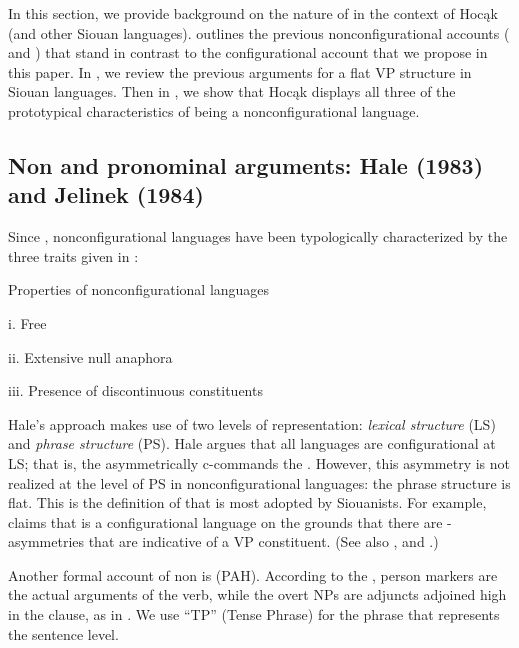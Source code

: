 \documentclass[output=paper]{LSP/langsci}
\begin{document}
 
In this section, we provide background on the nature of  in the context of Hocąk (and other Siouan languages).  outlines the previous nonconfigurational accounts (\citealt{Hale1983} and \citealt{Jelinek1984}) that stand in contrast to the configurational account that we propose in this paper. In , we review the previous arguments for a flat VP structure in Siouan languages. Then in , we show that Hocąk displays all three of the prototypical characteristics of being a nonconfigurational language.
 

\subsection{Non and pronominal arguments:  Hale (1983) and Jelinek (1984)}\label{sec:jrs:2.1}

Since \citet{Hale1983}, nonconfigurational languages have been typologically characterized by the three traits given in :

\begin{exe}
\ex\label{ex:jrs:3} Properties of nonconfigurational languages

	i.	Free 

	ii.	Extensive null anaphora

	iii.	Presence of discontinuous constituents
\end{exe}

Hale's approach makes use of two levels of representation: \textit{lexical structure} (LS) and \textit{phrase structure} (PS). Hale argues that all languages are configurational at LS; that is, the  asymmetrically c-commands the . However, this asymmetry is not realized at the level of PS in nonconfigurational languages: the phrase structure is flat. This is the definition of  that is most adopted by Siouanists. For example, \citet{Boyle2007} claims that  is a configurational language on the grounds that there are - asymmetries that are indicative of a VP constituent. (See also  \citealt{VanValin1985,VanValin1987,Williamson1984}, and \citealt{West2003}.) 

	Another formal account of non is  \textit{} (PAH). According to the , person markers are the actual arguments of the verb, while the overt NPs are adjuncts adjoined high in the clause, as in . We use ``TP'' (Tense Phrase) for the phrase that represents the sentence level.
\end{document}

